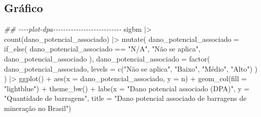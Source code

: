 \documentclass[
  letterpaper,
  DIV=11,
  numbers=noendperiod]{scrartcl}
\newenvironment{Shaded}{\begin{snugshade}}{\end{snugshade}}
\newcommand{\AttributeTok}[1]{\textcolor[rgb]{0.40,0.45,0.13}{#1}}
\newcommand{\DocumentationTok}[1]{\textcolor[rgb]{0.37,0.37,0.37}{\textit{#1}}}
\newcommand{\FunctionTok}[1]{\textcolor[rgb]{0.28,0.35,0.67}{#1}}
\newcommand{\NormalTok}[1]{\textcolor[rgb]{0.00,0.23,0.31}{#1}}
\newcommand{\SpecialCharTok}[1]{\textcolor[rgb]{0.37,0.37,0.37}{#1}}
\newcommand{\StringTok}[1]{\textcolor[rgb]{0.13,0.47,0.30}{#1}}
\begin{document}
\hypertarget{gruxe1fico}{%
\subsection{Gráfico}\label{gruxe1fico}}

\begin{Shaded}
\begin{Highlighting}[]
\DocumentationTok{\#\# {-}{-}{-}{-}plot{-}dpa{-}{-}{-}{-}{-}{-}{-}{-}{-}{-}{-}{-}{-}{-}{-}{-}{-}{-}{-}{-}{-}{-}{-}{-}{-}{-}{-}}
\NormalTok{sigbm }\SpecialCharTok{|\textgreater{}}
  \FunctionTok{count}\NormalTok{(dano\_potencial\_associado) }\SpecialCharTok{|\textgreater{}}
    \FunctionTok{mutate}\NormalTok{(}
    \AttributeTok{dano\_potencial\_associado =} \FunctionTok{if\_else}\NormalTok{(}
\NormalTok{      dano\_potencial\_associado }\SpecialCharTok{==} \StringTok{"N/A"}\NormalTok{,}
      \StringTok{"Não se aplica"}\NormalTok{,}
\NormalTok{      dano\_potencial\_associado}
\NormalTok{    ),}
    \AttributeTok{dano\_potencial\_associado =} \FunctionTok{factor}\NormalTok{(}
\NormalTok{      dano\_potencial\_associado,}
      \AttributeTok{levels =} \FunctionTok{c}\NormalTok{(}\StringTok{"Não se aplica"}\NormalTok{, }\StringTok{"Baixo"}\NormalTok{, }\StringTok{"Médio"}\NormalTok{, }\StringTok{"Alto"}\NormalTok{)}
\NormalTok{    )}
\NormalTok{  ) }\SpecialCharTok{|\textgreater{}}
  \FunctionTok{ggplot}\NormalTok{() }\SpecialCharTok{+}
  \FunctionTok{aes}\NormalTok{(}\AttributeTok{x =}\NormalTok{ dano\_potencial\_associado, }\AttributeTok{y =}\NormalTok{ n) }\SpecialCharTok{+}
  \FunctionTok{geom\_col}\NormalTok{(}\AttributeTok{fill =} \StringTok{"lightblue"}\NormalTok{) }\SpecialCharTok{+}
  \FunctionTok{theme\_bw}\NormalTok{() }\SpecialCharTok{+}
  \FunctionTok{labs}\NormalTok{(}\AttributeTok{x =} \StringTok{"Dano potencial associado (DPA)"}\NormalTok{, }\AttributeTok{y =} \StringTok{"Quantidade de barragens"}\NormalTok{,}
       \AttributeTok{title =} \StringTok{"Dano potencial associado de barragens de mineração no Brasil"}\NormalTok{)}
\end{Highlighting}
\end{Shaded}
\end{document}
